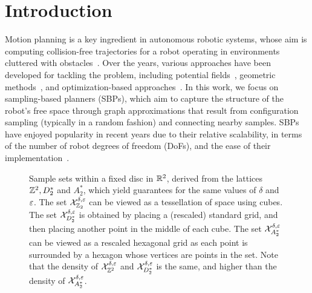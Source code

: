 \section{Introduction}
% 
Motion planning is a key ingredient in autonomous robotic systems, whose aim is computing collision-free trajectories for a robot operating in environments cluttered with obstacles~\cite{lavalle2006planning}. 
Over the years, various approaches have been developed for tackling the problem, including potential fields~\cite{luo2024potential}, geometric methods~\cite{halperin2017algorithmic}, and optimization-based approaches~\cite{SchulmanDHLABPPGA14,MalyutaEtAl2022,MarcucciEA23}. %
In this work, we focus on sampling-based planners (SBPs), which aim to capture the structure of the robot's free space through graph approximations that result from configuration sampling (typically in a random fashion) and connecting nearby samples. 
SBPs have enjoyed popularity in recent years due to their relative scalability, in terms of the number of robot degrees of freedom (DoFs), and the ease of their implementation~\cite{OrtheyCK24}. 

\begin{figure*}[h!]
  \centering
  \hfil
  \hfil
  \caption{Sample sets within a fixed disc in $\mathbb{R}^2$, derived from the lattices $\mathbb{Z}^2, D_2^*$ and $A^*_2$, which yield \decomp guarantees for the same values of $\delta$ and $\varepsilon$. The set $\mathcal{X}_{\mathbb{Z}_2}^{\delta,\varepsilon}$ can be viewed as a tessellation of space using cubes. The set $\mathcal{X}_{D_2^*}^{\delta,\varepsilon}$ is obtained by placing a (rescaled) standard grid, and then placing another point in the middle of each cube. The set $\mathcal{X}_{A_2^*}^{\delta,\varepsilon}$ can be viewed as a rescaled hexagonal grid as each point is surrounded by a hexagon whose vertices are points in the set. Note that the density of $\mathcal{X}_{\mathbb{Z}^2}^{\delta,\varepsilon}$ and $\mathcal{X}_{D^*_2}^{\delta,\varepsilon}$ is the same, and higher than the density of $\mathcal{X}_{A^*_2}^{\delta,\varepsilon}$.}
  \label{fig:2d_lattices}
\end{figure*}

